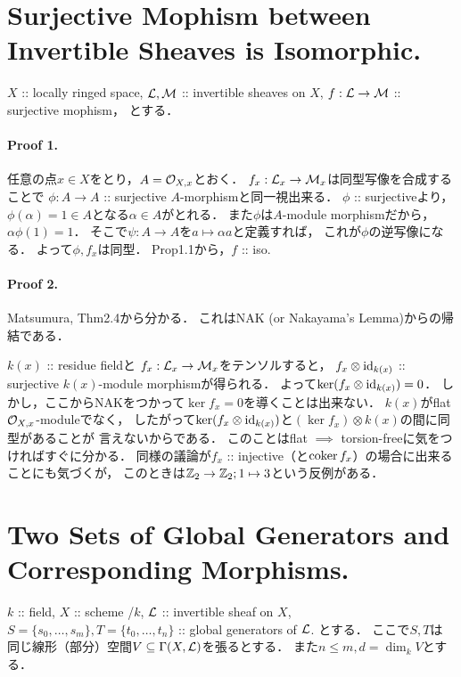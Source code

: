 \documentclass[a4paper]{jsarticle}
\begin{document}
\section{Surjective Mophism between Invertible Sheaves is Isomorphic.} %
    $X$ :: locally ringed space,
    $\mathcal{L}, \mathcal{M}$ :: invertible sheaves on $X$,
    $f: \mathcal{L} \to \mathcal{M}$ :: surjective mophism，
    とする．
    
    \paragraph{Proof 1.}
    任意の点$x \in X$をとり，$A=\mathcal{O}_{X,x}$とおく．
    $f_x: \mathcal{L}_x \to \mathcal{M}_x$は同型写像を合成することで
    $\phi: A \to A$ :: surjective $A$-morphismと同一視出来る．
    $\phi$ :: surjectiveより，
    $\phi(\alpha)=1 \in A$となる$\alpha \in A$がとれる．
    また$\phi$は$A$-module morphismだから，$\alpha \phi(1)=1$．
    そこで$\psi: A \to A$を$a \mapsto \alpha a$と定義すれば，
    これが$\phi$の逆写像になる．
    よって$\phi, f_x$は同型．
    Prop1.1から，$f$ :: iso.

    \paragraph{Proof 2.}
    Matsumura, Thm2.4から分かる．
    これはNAK (or Nakayama's Lemma)からの帰結である．

    \begin{Remark}
        $k(x)$ :: residue fieldと
        $f_x: \mathcal{L}_x \to \mathcal{M}_x$をテンソルすると，
        $f_x \otimes \mathrm{id}_{k(x)}$ :: surjective $k(x)$-module morphismが得られる．
        よって$\ker (f_x \otimes \mathrm{id}_{k(x)})=0$．
        しかし，ここからNAKをつかって$\ker f_x=0$を導くことは出来ない．
        $k(x)$がflat $\mathcal{O}_{X,x}$-moduleでなく，
        したがって$\ker (f_x \otimes \mathrm{id}_{k(x)})$と$(\ker f_x) \otimes k(x)$の間に同型があることが
        言えないからである．
        このことはflat $\implies$ torsion-freeに気をつければすぐに分かる．
        同様の議論が$f_x$ :: injective（と$\operatorname{coker} f_x$）の場合に出来ることにも気づくが，
        このときは$\mathbb{Z}_2 \to \mathbb{Z}_2; 1 \mapsto 3$という反例がある．
    \end{Remark}

\section{Two Sets of Global Generators and Corresponding Morphisms.} %
    $k$ :: field,
    $X$ :: scheme /$k$,
    $\mathcal{L}$ :: invertible sheaf on $X$,
    $S=\{s_0,\dots,s_m\}, T=\{t_0,\dots,t_n\}$ :: global generators of $\mathcal{L}$.
    とする．
    ここで$S,T$は
    同じ線形（部分）空間$V \subseteq \Gamma(X, \mathcal{L})$を張るとする．
    また$n \leq m, d=\dim_k V$とする．
\end{document}
